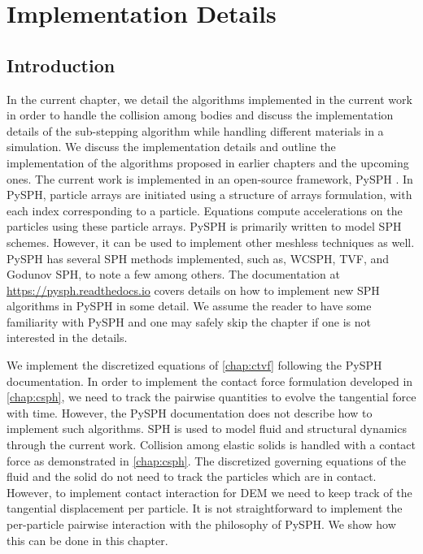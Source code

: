 \chapter{Implementation Details}
\label{chap:implementation_detail}
\section{Introduction}
\label{sec:intro}

In the current chapter, we detail the algorithms implemented in the current work
in order to handle the collision among bodies and discuss the implementation
details of the sub-stepping algorithm while handling different materials in a
simulation. We discuss the implementation details and outline the implementation
of the algorithms proposed in earlier chapters and the upcoming ones. The
current work is implemented in an open-source framework, PySPH
\citep{pysph2020}. In PySPH, particle arrays are initiated using a structure of
arrays formulation, with each index corresponding to a particle. Equations
compute accelerations on the particles using these particle arrays. PySPH is
primarily written to model SPH schemes. However, it can be used to implement
other meshless techniques as well. PySPH has several SPH methods implemented,
such as, WCSPH, TVF, and Godunov SPH, to note a few among others. The
documentation at \url{https://pysph.readthedocs.io} covers details on how to
implement new SPH algorithms in PySPH in some detail. We assume the reader to
have some familiarity with PySPH and one may safely skip the chapter if one
is not interested in the details.


We implement the discretized equations of \cref{chap:ctvf} following the PySPH
documentation. In order to implement the contact force formulation developed in
\cref{chap:csph}, we need to track the pairwise quantities to evolve the
tangential force with time. However, the PySPH documentation does not describe
how to implement such algorithms. SPH is used to model fluid and structural
dynamics through the current work. Collision among elastic solids is handled
with a contact force as demonstrated in \cref{chap:csph}. The discretized
governing equations of the fluid and the solid do not need to track the
particles which are in contact. However, to implement contact interaction for
DEM we need to keep track of the tangential displacement per particle. It is not
straightforward to implement the per-particle pairwise interaction with the
philosophy of PySPH. We show how this can be done in this chapter.

